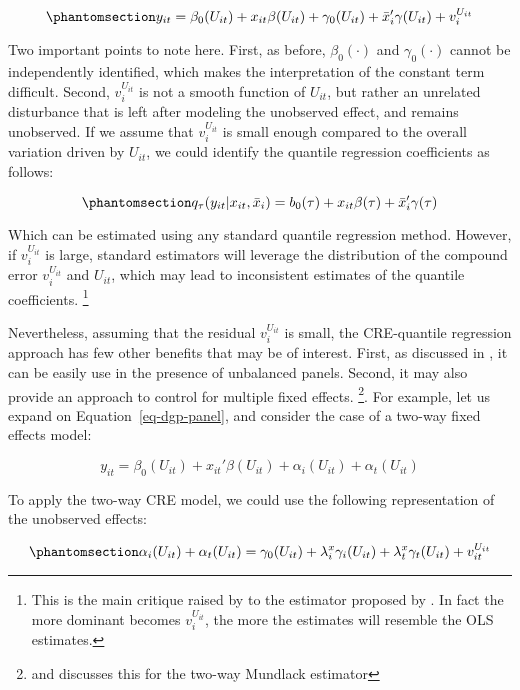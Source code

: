 \documentclass[bib]{statapress}
\begin{document}
\begin{equation}\phantomsection\label{eq-cre-dgp}{y_{it} = \beta_0(U_{it}) + x_{it}\beta(U_{it}) + \gamma_0(U_{it}) + \bar x_i'\gamma(U_{it}) + v^{U_{it}}_i 
}\end{equation}

Two important points to note here. First, as before, \(\beta_0(\cdot)\)
and \(\gamma_0(\cdot)\) cannot be independently identified, which makes
the interpretation of the constant term difficult. Second,
\(v^{U_{it}}_i\) is not a smooth function of \(U_{it}\), but rather an
unrelated disturbance that is left after modeling the unobserved effect,
and remains unobserved. If we assume that \(v^{U_{it}}_i\) is small
enough compared to the overall variation driven by \(U_{it}\), we could
identify the quantile regression coefficients as follows:

\begin{equation}\phantomsection\label{eq-cre-1way}{q_\tau(y_{it}|x_{it},\bar x_i)=b_0(\tau) + x_{it}\beta(\tau)+\bar x_i'\gamma(\tau)
}\end{equation}

Which can be estimated using any standard quantile regression method.
However, if \(v^{U_{it}}_i\) is large, standard estimators will leverage
the distribution of the compound error \(v^{U_{it}}_i\) and \(U_{it}\),
which may lead to inconsistent estimates of the quantile coefficients.
\footnote{This is the main critique raised by \citet{canay2011} to the
  estimator proposed by \citet{abrevaya2008}. In fact the more dominant
  becomes \(v^{U_{it}}_i\), the more the estimates will resemble the OLS
  estimates.}

Nevertheless, assuming that the residual \(v^{U_{it}}_i\) is small, the
CRE-quantile regression approach has few other benefits that may be of
interest. First, as discussed in \citet{wooldridge2019}, it can be
easily use in the presence of unbalanced panels. Second, it may also
provide an approach to control for multiple fixed effects. \footnote{\citet{baltagi2023}
  and \citet{wooldridge2021} discusses this for the two-way Mundlack
  estimator}. For example, let us expand on Equation~\ref{eq-dgp-panel},
and consider the case of a two-way fixed effects model:

\[y_{it} = \beta_0(U_{it}) + x_{it}'\beta(U_{it}) + \alpha_i(U_{it}) + \alpha_t(U_{it})
\]

To apply the two-way CRE model, we could use the following
representation of the unobserved effects:

\begin{equation}\phantomsection\label{eq-cre-unobs}{\alpha_i(U_{it}) + \alpha_t(U_{it}) = \gamma_0(U_{it}) + \lambda_i^x \gamma_i(U_{it}) + \lambda_t^x \gamma_t(U_{it}) + v^{U_{it}}_{it}
}\end{equation}
\end{document}
